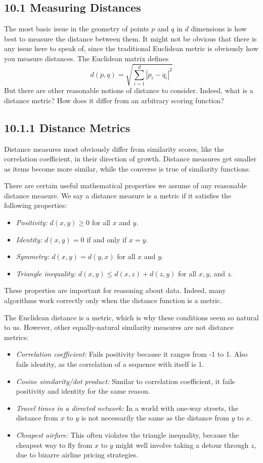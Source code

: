 \documentclass[10pt]{article}
\begin{document}
\subsection*{10.1 Measuring Distances} 
The most basic issue in the geometry of points $p$ and $q$ in $d$ dimensions is how best to measure the distance between them. It might not be obvious that there is any issue here to speak of, since the traditional Euclidean metric is obviously how you measure distances. The Euclidean matrix defines
\[
d(p, q)=\sqrt{\sum_{i=1}^{d}\left|p_{i}-q_{i}\right|^{2}}
\]
But there are other reasonable notions of distance to consider. Indeed, what is a distance metric? How does it differ from an arbitrary scoring function?

\subsection*{10.1.1 Distance Metrics}
Distance measures most obviously differ from similarity scores, like the correlation coefficient, in their direction of growth. Distance measures get smaller as items become more similar, while the converse is true of similarity functions.

There are certain useful mathematical properties we assume of any reasonable distance measure. We say a distance measure is a metric if it satisfies the following properties:
\begin{itemize}
    \item \textit{Positivity:} $d(x, y) \geq 0$ for all $x$ and $y$.
    \item \textit{Identity:} $d(x, y)=0$ if and only if $x=y$.
    \item \textit{Symmetry:} $d(x, y)=d(y, x)$ for all $x$ and $y$.
    \item \textit{Triangle inequality:} $d(x, y) \leq d(x, z)+d(z, y)$ for all $x, y$, and $z$.
\end{itemize}
These properties are important for reasoning about data. Indeed, many algorithms work correctly only when the distance function is a metric.

The Euclidean distance is a metric, which is why these conditions seem so natural to us. However, other equally-natural similarity measures are not distance metrics:
\begin{itemize}
    \item \textit{Correlation coefficient:} Fails positivity because it ranges from -1 to 1. Also fails identity, as the correlation of a sequence with itself is 1.
    \item \textit{Cosine similarity/dot product:} Similar to correlation coefficient, it fails positivity and identity for the same reason.
    \item \textit{Travel times in a directed network:} In a world with one-way streets, the distance from $x$ to $y$ is not necessarily the same as the distance from $y$ to $x$.
    \item \textit{Cheapest airfare:} This often violates the triangle inequality, because the cheapest way to fly from $x$ to $y$ might well involve taking a detour through $z$, due to bizarre airline pricing strategies.
\end{itemize}
\end{document}

